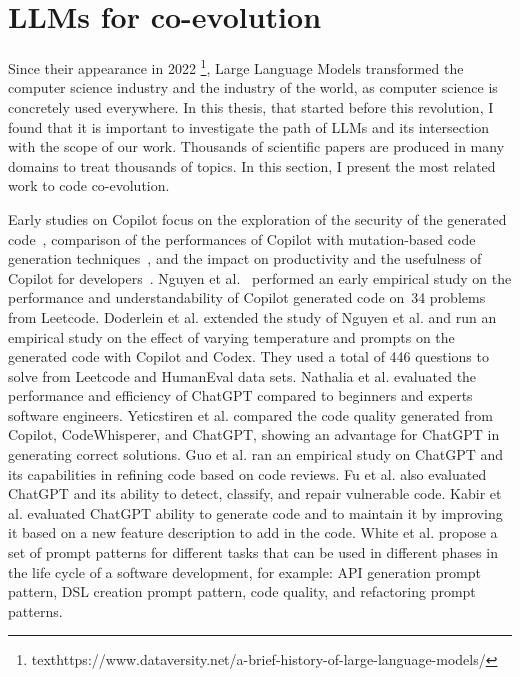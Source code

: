  \section{LLMs for co-evolution }
  \label{llmsforcoevolution}
  Since their appearance in 2022 \footnote{texthttps://www.dataversity.net/a-brief-history-of-large-language-models/}, Large Language Models transformed the computer science industry and the industry of the world, as computer science is concretely used everywhere. In this thesis, that started before this revolution, I found that it is important to investigate the path of LLMs and its intersection with the scope of our work. Thousands of scientific papers are produced in many domains to treat thousands of topics. In this section, I present the most related work to code co-evolution.
  
  Early studies on Copilot focus on the exploration of the security of the generated code~\cite{pearce2022asleep}, comparison of the performances of Copilot with mutation-based code generation techniques~\cite{sobania2022choose}, and  the impact on productivity and the usefulness of Copilot for developers~\cite{ziegler2022productivity,vaithilingam2022expectation}.
  Nguyen et al.~\cite{nguyen2022empirical} performed an early empirical study on the performance and understandability of Copilot generated code on~34 problems from Leetcode. 
  Doderlein et al. \cite{doderlein2022piloting} extended the study of Nguyen et al. \cite{nguyen2022empirical} and run an empirical study on the effect of varying temperature and prompts on the generated code with Copilot and Codex. They used a total of 446 questions to solve from Leetcode and HumanEval data sets.  
  Nathalia et al. \cite{nathalia2023artificial} evaluated the performance and efficiency of ChatGPT compared to beginners and experts software engineers. 
  Yeticstiren et al. \cite{yeticstiren2023evaluating} compared the code quality generated from Copilot, CodeWhisperer, and ChatGPT, showing an advantage for ChatGPT in generating correct solutions. 
  Guo et al. \cite{guo2023exploring} ran an empirical study on ChatGPT and its capabilities in refining code based on code reviews. 
  Fu et al. \cite{fu2023chatgpt} also evaluated ChatGPT and its ability to detect, classify, and repair vulnerable code. 
  Kabir et al. \cite{kabir2023empirical} evaluated ChatGPT ability to generate code and to maintain it by improving it based on a new feature description to add in the code.  
 White et al. \cite{White2024} propose a set of prompt patterns for different tasks that can be used in different phases in the life cycle of a software development, for example: API generation prompt pattern, DSL creation prompt pattern, code quality, and refactoring prompt patterns.
  
